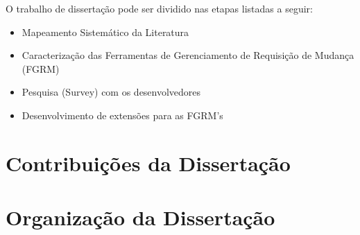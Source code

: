 O trabalho de dissertação pode ser dividido nas etapas listadas a seguir:

\begin{itemize}[(i)]
	\item Mapeamento Sistemático da Literatura~\cite{keele2007guidelines}
	\item Caracterização das Ferramentas de Gerenciamento de Requisição de Mudança (FGRM)
	\item Pesquisa (Survey) com os desenvolvedores~\cite{wohlin2012experimentation}
	\item Desenvolvimento de extensões para as FGRM's
\end{itemize}

\section{Contribuições da Dissertação}
\label{sec:intro-contribuicao}

\section{Organização da Dissertação}
\label{sec:intro-organizacao-dissertacao}
